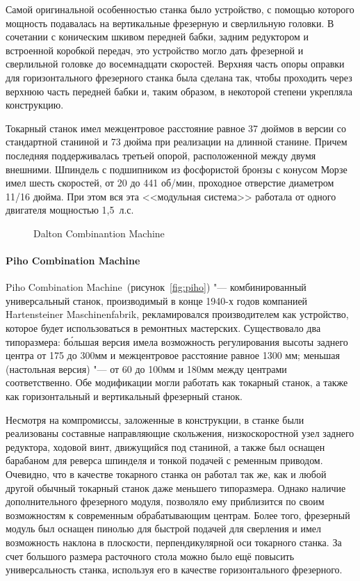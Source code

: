 Самой оригинальной особенностью станка было устройство, с помощью которого мощность подавалась на вертикальные фрезерную и сверлильную головки. В сочетании с коническим шкивом передней бабки, задним редуктором и встроенной коробкой передач, это устройство могло дать фрезерной и сверлильной головке до восемнадцати скоростей. Верхняя часть опоры оправки для горизонтального фрезерного станка была сделана так, чтобы проходить через верхнюю часть передней бабки и, таким образом, в некоторой степени укрепляла конструкцию.

Токарный станок имел межцентровое расстояние равное 37 дюймов в версии со стандартной станиной и 73 дюйма при реализации на длинной станине. Причем последняя поддерживалась третьей опорой, расположенной между двумя внешними. Шпиндель с подшипником из фосфористой бронзы с конусом Морзе имел шесть скоростей, от 20 до 441 об/мин, проходное отверстие диаметром 11/16 дюйма. При этом вся эта <<модульная система>> работала от одного двигателя мощностью 1,5~л.\:с.

\begin{figure}[ht]
	\caption{Dalton Combinantion Machine}\label{fig:dalton}
\end{figure}

\paragraph{Piho Combination Machine}

Piho Combination Machine~(рисунок~\cref{fig:piho}) "--- комбинированный универсальный станок, производимый в конце 1940-х годов компанией Hartensteiner Maschinenfabrik, рекламировался производителем как устройство, которое будет использоваться в ремонтных мастерских. Существовало два типоразмера: б\'ольшая версия имела возможность регулирования высоты заднего центра от 175 до 300\:мм и межцентровое расстояние равное 1300 мм; меньшая (настольная версия) "--- от 60 до 100\:мм и 180\:мм между центрами соответственно. Обе модификации могли работать как токарный станок, а также как горизонтальный и вертикальный фрезерный станок.

Несмотря на компромиссы, заложенные в конструкции, в станке были реализованы составные направляющие скольжения, низкоскоростной узел заднего редуктора, ходовой винт, движущийся под станиной, а также был оснащен барабаном для реверса шпинделя и тонкой подачей с ременным приводом. Очевидно, что в качестве токарного станка он работал так же, как и любой другой обычный токарный станок даже меньшего типоразмера. Однако наличие дополнительного фрезерного модуля, позволяло ему приблизится по своим возможностям к современным обрабатывающим центрам. Более того, фрезерный модуль был оснащен пинолью для быстрой подачей для сверления и имел возможность наклона в плоскости, перпендикулярной оси токарного станка. За счет большого размера расточного стола можно было ещё повысить универсальность станка, используя его в качестве горизонтального фрезерного.

